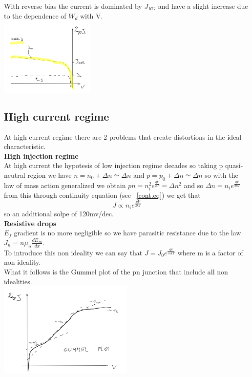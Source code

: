 With reverse bias the current is dominated by $J_{RG}$ and have a slight increase due to the dependence of $W_d$ with V.\\

\centering
\includegraphics[width=0.35\textwidth]{inverselow.png}\\
\raggedright

\subsection{High current regime}
At high current regime there are 2 problems that create distortions in the ideal characteristic.\\
\vspace{5mm}
{\bf High injection regime}\\
At high current the hypotesis of low injection regime decades so taking p quasi-neutral region we have $n=n_0+\Delta n\simeq\Delta n$ and $p=p_0+\Delta n\simeq \Delta n$ so with the law of mass action generalized we obtain $pn=n_i^2e^{\frac{qV}{kT}}=\Delta n^2$ and so $\Delta n=n_ie^{\frac{qV}{2kT}}$ from this through continuity equation (see ~\ref{cont.eq}) we get that 
\begin{equation}
J\propto n_ie^{\frac{qV}{2kT}}
\end{equation}
so an additional solpe of 120mv/dec.\\ 
\vspace{5mm}
{\bf Resistive drops}\\
$E_f$ gradient is no more negligible so we have parasitic resistance due to the law $J_n=n\mu_n \frac{dE_{fn}}{dx}$.\\
To introduce this non ideality we can say that $J=J_0e^{\frac{qv}{mkT}}$ where m is a factor of non ideality.\\
What it follows is the Gummel plot of the pn junction that include all non idealities.\\

\centering
\includegraphics[width=0.5\textwidth]{gummel.png}\\
\raggedright

